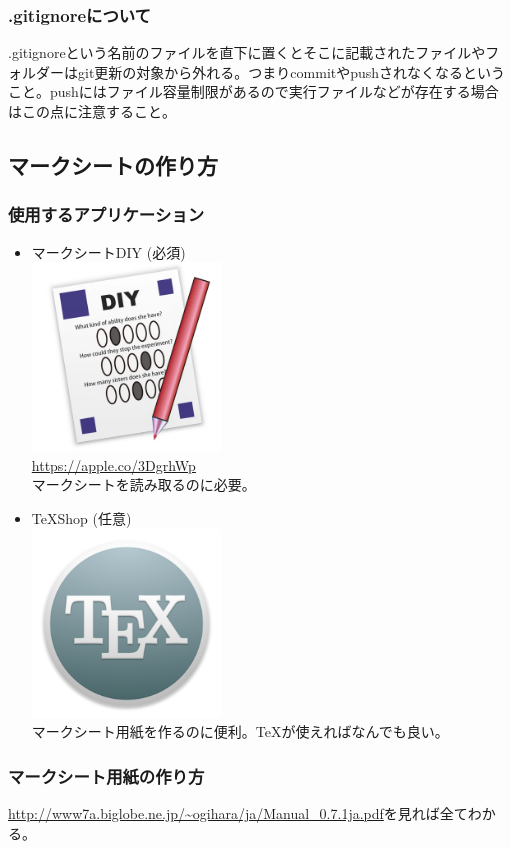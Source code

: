 \documentclass[dvipdfmx,jb5]{jarticle}
\begin{document}
\subsubsection{.gitignoreについて}\label{sec:gitignore}
.gitignoreという名前のファイルを直下に置くとそこに記載されたファイルやフォルダーはgit更新の対象から外れる。つまりcommitやpushされなくなるということ。pushにはファイル容量制限があるので実行ファイルなどが存在する場合はこの点に注意すること。
\subsection{マークシートの作り方}
\subsubsection{使用するアプリケーション}
\begin{itemize}
 \item マークシートDIY {\color{red}(必須)}\\
 \includegraphics[width=5cm]{assets/answersheet-diy.png}\\
 \url{https://apple.co/3DgrhWp}\\
 マークシートを読み取るのに必要。
 \item \TeX Shop (任意)\\
 \includegraphics[width=5cm]{assets/TeX.png}\\
 マークシート用紙を作るのに便利。\TeX が使えればなんでも良い。
\end{itemize}
 \subsubsection{マークシート用紙の作り方}
 \url{http://www7a.biglobe.ne.jp/~ogihara/ja/Manual_0.7.1ja.pdf}を見れば全てわかる。
\end{document}
